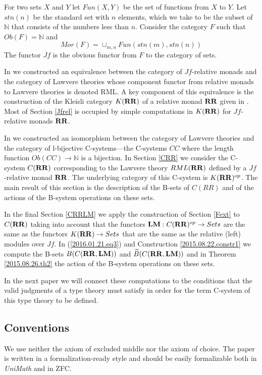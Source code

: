 \documentclass[onecolumn,12pt]{amsart}
\numberwithin{proposition}{subsection}
\newcommand{\sr}{\rightarrow}
\newcommand{\nn}{{\mathbb N}}
\newcommand{\nat}{\nn}
\newcommand{\wt}{\widetilde}
\newcommand{\RR}{{\bf RR}}
\newcommand{\LM}{{\bf LM}}
\begin{document}
For two sets $X$ and $Y$ let $Fun(X,Y)$ be the set of functions from $X$ to
$Y$.  Let $stn(n)$ be the standard set with $n$ elements, which we take to be the
subset of $\nat$ that consists of the numbers less than $n$. Consider the category $F$ such
that $Ob(F)=\nn$ and
%
$$Mor(F)=\cup_{m,n}Fun(stn(m),stn(n))$$
%
The functor $Jf$ is the obvious functor from $F$ to the category of sets. 

In \cite{LandJf} we constructed an equivalence between the category of
$Jf$-relative monads and the category of Lawvere theories whose component
functor from relative monads to Lawvere theories is denoted \gls{RML}. A key
component of this equivalence is the construction of the Kleisli category
$K(\RR)$ of a relative monad $\RR$ given in \cite{ACU2}.  Most of Section
\ref{Jfrel} is occupied by simple computations in $K(\RR)$ for $Jf$-relative
monads $\RR$.

In \cite{LandC} we constructed an isomorphism between the category of Lawvere
theories and the category of l-bijective C-systems---the C-systems $CC$ where
the length function $Ob(CC)\sr \nat$ is a bijection. In Section \ref{CRR} we
consider the C-system $C(\RR)$ corresponding to the Lawvere theory $RML(\RR)$
defined by a $Jf$-relative monad $\RR$. The underlying category of this
C-system is $K(\RR)^{op}$. The main result of this section is the description
of the B-sets of $C(RR)$ and of the actions of the B-system operations on these
sets.

In the final Section \ref{CRRLM} we apply the construction of Section
\ref{Fext} to $C(\RR)$ taking into account that the functors
$\LM:C(\RR)^{op}\sr Sets$ are the same as the functors $K(\RR)\sr Sets$ that
are the same as the relative (left) modules over $Jf$. In
(\ref{2016.01.21.eq3}) and Construction \ref{2015.08.22.constr1} we compute the
B-sets $B(C(\RR,\LM))$ and $\wt{B}(C(\RR,\LM))$ and in Theorem
\ref{2015.08.26.th2} the action of the B-system operations on these sets.

In the next paper we will connect these computations to the conditions that the
valid judgments of a type theory must satisfy in order for the term C-system
of this type theory to be defined.

\subsection{Conventions}

We use neither the axiom of excluded middle nor the axiom of choice. The paper
is written in a formalization-ready style and should be easily formalizable
both in {\em UniMath} and in ZFC.
\end{document}
